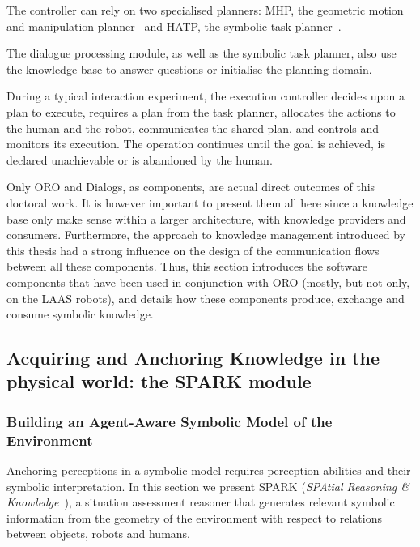 The controller can rely on two specialised planners: MHP, the geometric motion
and manipulation planner~\cite{Sisbot2008, Mainprice2011, Pandey2010} and HATP,
the symbolic task planner~\cite{Alili2009}.

The dialogue processing module, as well as the symbolic task planner, also use
the knowledge base to answer questions or initialise the planning domain.

During a typical interaction experiment, the execution controller decides upon
a plan to execute, requires a plan from the task planner, allocates the actions
to the human and the robot, communicates the shared plan, and controls and
monitors its execution. The operation continues until the goal is achieved, is
declared unachievable or is abandoned by the human.

Only ORO and Dialogs, as components, are actual direct outcomes of this
doctoral work. It is however important to present them all here since a
knowledge base only make sense within a larger architecture, with knowledge
providers and consumers.  Furthermore, the approach to knowledge management
introduced by this thesis had a strong influence on the design of the
communication flows between all these components. Thus, this section introduces
the software components that have been used in conjunction with ORO (mostly,
but not only, on the LAAS robots), and details how these components produce,
exchange and consume symbolic knowledge.

\subsection{Acquiring and Anchoring Knowledge in the physical world: the SPARK module}
\label{sect|spark}

\subsubsection{Building an Agent-Aware Symbolic Model of the Environment}
\label{sect|situ}

Anchoring perceptions in a symbolic model requires perception abilities and
their symbolic interpretation. In this section we present SPARK (\emph{SPAtial
Reasoning \& Knowledge}~\cite{Sisbot2011}), a situation assessment reasoner
that generates relevant symbolic information from the geometry of the
environment with respect to relations between objects, robots and humans.

